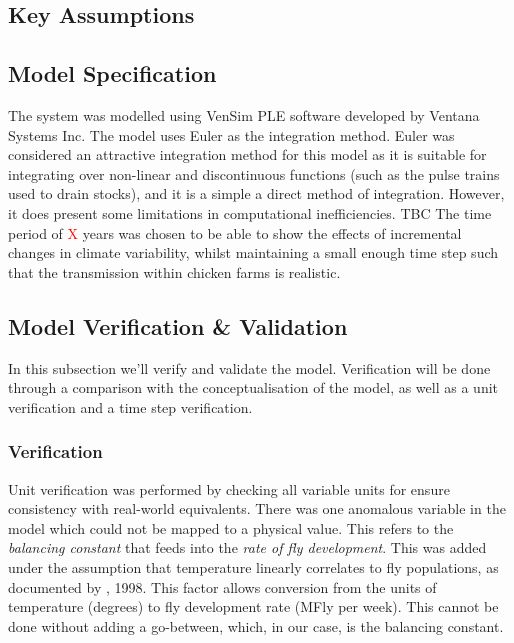 \subsection{Key Assumptions}

\subsection{Model Specification}

The system was modelled using VenSim PLE software developed by Ventana Systems Inc.
The model uses Euler as the integration method. Euler was considered an attractive integration method for this model as it is suitable for integrating over non-linear and discontinuous functions (such as the pulse trains used to drain stocks), and it is a simple a direct method of integration. However, it does present some limitations in computational inefficiencies.
TBC
The time period of \textcolor{red}{X} years was chosen to be able to show the effects of incremental changes in climate variability, whilst maintaining a small enough time step such that the transmission within chicken farms is realistic.
\subsection{Model Verification & Validation}
In this subsection we'll verify and validate the model. Verification will be done through a comparison with the conceptualisation of the model, as well as a unit verification and a time step verification. 

\subsubsection{Verification}


Unit verification was performed by checking all variable units for ensure consistency with real-world equivalents. There was one anomalous variable in the model which could not be mapped to a physical value. This refers to the \textit{balancing constant} that feeds into the \textit{rate of fly development}. This was added under the assumption that temperature linearly correlates to fly populations, as documented by \citeauthor{blanckenhorn_adaptive_1998}, 1998. This factor allows conversion from the units of temperature (degrees) to fly development rate (MFly per week). This cannot be done without adding a go-between, which, in our case, is the balancing constant. 

